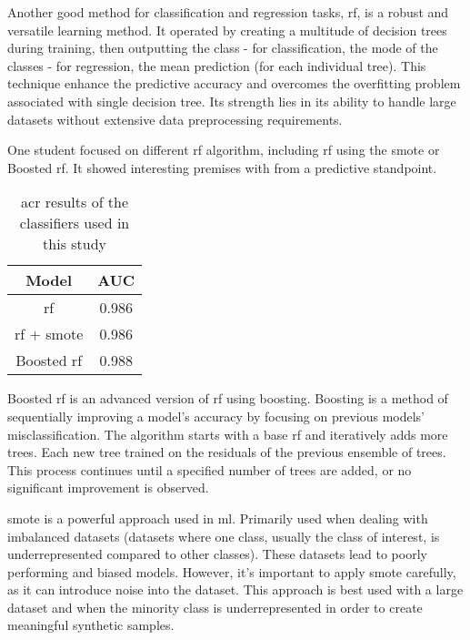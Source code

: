 \documentclass[../../../main.tex]{subfiles}
\begin{document}
Another good method for classification and regression tasks, \acrfull{rf}, is a robust and versatile learning method. It operated by creating a multitude of decision trees during training, then outputting the class - for classification, the mode of the classes - for regression, the mean prediction (for each individual tree).
This technique enhance the predictive accuracy and overcomes the overfitting problem associated with single decision tree.
Its strength lies in its ability to handle large datasets without extensive data preprocessing requirements. 

One student focused on different \acrfull{rf} algorithm, including \acrfull{rf} using the \acrfull{smote} or Boosted \acrshort{rf}. It showed interesting premises with from a predictive standpoint. \cite{lee_machine_2019}
\begin{table}[H]
    \centering
    \caption{\acrfull{acr} results of the classifiers used in this study\cite{lee_machine_2019}}
    \begin{tabular}{|c|c|}
        \hline
        \textbf{Model} & \textbf{AUC}\\
        \hline
        \acrfull{rf} & 0.986 \\
        \hline
        \acrshort{rf} + \acrshort{smote} & 0.986\\
        \hline
        Boosted \acrshort{rf} & 0.988 \\
        \hline
    \end{tabular}
    \label{tab:auc_values_lee}
\end{table}

Boosted \acrshort{rf} is an advanced version of \acrshort{rf} using boosting. Boosting is a method of sequentially improving a model's accuracy by focusing on previous models' misclassification. The algorithm starts with a base \acrshort{rf} and iteratively adds more trees. Each new tree trained on the residuals of the previous ensemble of trees. This process continues until a specified number of trees are added, or no significant improvement is observed.

\acrfull{smote} is a powerful approach used in \acrshort{ml}. Primarily used when dealing with imbalanced datasets (datasets where one class, usually the class of interest, is underrepresented compared to other classes). These datasets lead to poorly performing and biased models.
However, it's important to apply \acrshort{smote} carefully, as it can introduce noise into the dataset. This approach is best used with a large dataset and when the minority class is underrepresented in order to create meaningful synthetic samples.
\end{document}
